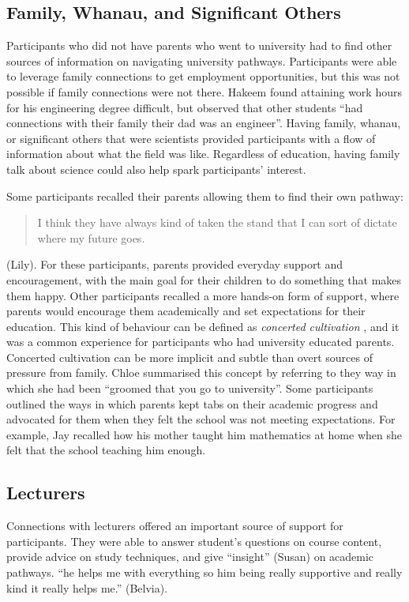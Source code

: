 \subsection{Family, Whanau, and Significant Others}
Participants who did not have parents who went to university had to find other sources of information on navigating university pathways. Participants were able to leverage family connections to get employment opportunities, but this was not possible if family connections were not there. Hakeem found attaining work hours for his engineering degree difficult, but observed that other students ``had connections with their family their dad was an engineer''. Having family, whanau, or significant others that were scientists provided participants with a flow of information about what the field was like. Regardless of education, having family talk about science could also help spark participants' interest. 

Some participants recalled their parents allowing them to find their own pathway: \blockquote{I think they have always kind of taken the stand that I can sort of dictate where my future goes.} (Lily). For these participants, parents provided everyday support and encouragement, with the main goal for their children to do something that makes them happy. Other participants recalled a more hands-on form of support, where parents would encourage them academically and set expectations for their education. This kind of behaviour can be defined as \textit{concerted cultivation} \citep{lareau2011unequal}, and it was a common experience for participants who had university educated parents. Concerted cultivation can be more implicit and subtle than overt sources of pressure from family. Chloe summarised this concept by referring to they way in which she had been ``groomed that you go to university''. Some participants outlined the ways in which parents kept tabs on their academic progress and advocated for them when they felt the school was not meeting expectations. For example, Jay recalled how his mother taught him mathematics at home when she felt that the school teaching him enough.

\subsection{Lecturers}
Connections with lecturers offered an important source of support for participants. They were able to answer student's questions on course content, provide advice on study techniques, and give ``insight'' (Susan) on academic pathways. ``he helps me with everything so him being really supportive and really kind it really helps me.'' (Belvia).

